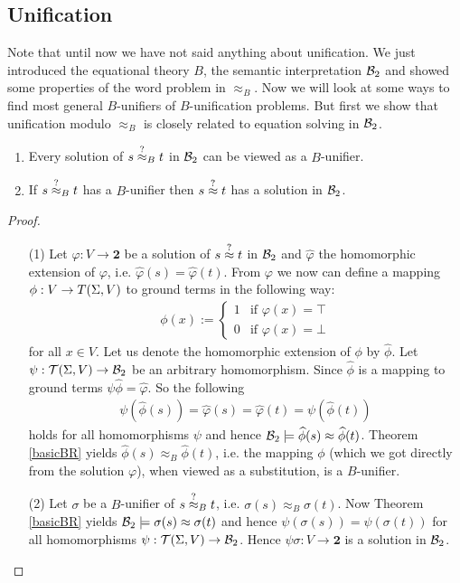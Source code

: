 		\subsection{Unification}
		Note that until now we have not said anything about unification. We just introduced the equational theory $B$, the semantic interpretation ${\mathcal{B}_2}$ and showed some properties of the word problem in $\approx_B$. Now we will look at some ways to find most general $B$-unifiers of $B$-unification problems. But first we show that unification modulo $\approx_B$ is closely related to equation solving in ${\mathcal{B}_2}$.
		\begin{lemma}\mbox{}
		\begin{enumerate}
		\item Every solution of $s\stackrel{?}{\approx}_B t$ in ${\mathcal{B}_2}$ can be viewed as a $B$-unifier.
		\item If $s\stackrel{?}{\approx}_B t$ has a $B$-unifier then $s\stackrel{?}{\approx} t$ has a solution in ${\mathcal{B}_2}$.
		\end{enumerate}
		\end{lemma}
		\begin{proof}\mbox{}
		\begin{itemize}
		\item[(1)]Let $\varphi:V\to\textbf{2}$ be a solution of $s\stackrel{?}{\approx} t$ in ${\mathcal{B}_2}$ and $\widehat{\varphi}$ the homomorphic extension of $\varphi$, i.e. $\widehat{\varphi}(s)=\widehat{\varphi}(t)$. From $\varphi$ we now can define a mapping $\phi:V\to T(\Sigma,V)$ to ground terms in the following way:
		\begin{align*}
		\phi(x):=\begin{cases}
		1 & \text{if }\varphi(x)=\top\\
		0 & \text{if }\varphi(x)=\bot
		\end{cases}
		\end{align*}
		for all $x\in V$. Let us denote the homomorphic extension of $\phi$ by $\widehat{\phi}$. Let $\psi:\mathcal{T}(\Sigma,V)\to{\mathcal{B}_2}$ be an arbitrary homomorphism. Since $\widehat{\phi}$ is a mapping to ground terms $\psi\widehat{\phi}=\widehat{\varphi}$. So the following
		\begin{align*}
		\psi\left( \widehat{\phi}(s)\right)=\widehat{\varphi}(s)=\widehat{\varphi}(t)=\psi\left( \widehat{\phi}(t)\right) 
		\end{align*}
		holds for all homomorphisms $\psi$ and hence ${\mathcal{B}_2}\models\widehat{\phi}(s)\approx\widehat{\phi}(t)$. Theorem \ref{basicBR} yields $\widehat{\phi}(s)\approx_B\widehat{\phi}(t)$, i.e. the mapping $\phi$ (which we got directly from the solution $\varphi$), when viewed as a substitution, is a $B$-unifier.
		\item[(2)] Let $\sigma$ be a $B$-unifier of $s\stackrel{?}{\approx}_B t$, i.e. $\sigma(s)\approx_B\sigma(t)$. Now Theorem \ref{basicBR} yields ${\mathcal{B}_2}\models\sigma(s)\approx\sigma(t)$ and hence $\psi\left(\sigma (s)\right)=\psi\left(\sigma (t)\right)$ for all homomorphisms $\psi:\mathcal{T}(\Sigma,V)\to{\mathcal{B}_2}$. Hence $\psi\sigma:V\to\textbf{2}$ is a solution in ${\mathcal{B}_2}$.
		\end{itemize}
		\end{proof}
